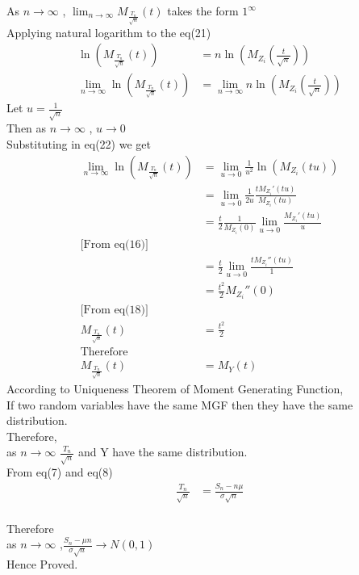 \documentclass[journal,12pt,twocolumn]{IEEEtran}
\begin{document}
As $n \to \infty $ , $\lim_{n \to \infty} M_{\frac{T_n}{\sqrt{n}}}(t)$ takes the form $1^\infty$
\\Applying natural logarithm to the eq(21)
 \begin{align}
    \ln(M_{\frac{T_n}{\sqrt{n}}}(t))&=n\ln(M_{Z_i}(\frac{t}{\sqrt{n}}))\nonumber\\
    \lim_{n \to \infty}\ln(M_{\frac{T_n}{\sqrt{n}}}(t))&=\lim_{n \to \infty}n\ln(M_{Z_i}(\frac{t}{\sqrt{n}}))
    \end{align}
Let $u=\frac{1}{\sqrt{n}}$
\\Then as $n \to \infty $ , $u \to 0 $ 
\\Substituting in eq(22) we get
\begin{align}
    \lim_{n \to \infty}\ln(M_{\frac{T_n}{\sqrt{n}}}(t))&=\lim_{u \to 0}\frac{1}{u^2}\ln(M_{Z_i}(tu))\nonumber\\
    &=\lim_{u \to 0}\frac{1}{2u}\frac{tM_{Z_i}'(tu)}{M_{Z_i}(tu)}\nonumber\\
    &=\frac{t}{2}\frac{1}{M_{Z_i}(0)}\lim_{u \to 0}\frac{M_{Z_i}'(tu)}{u}\nonumber\\
    \text{[From eq(16)]}\nonumber\\
    &=\frac{t}{2}\lim_{u \to 0}\frac{tM_{Z_i}''(tu)}{1} \nonumber\\
    &=\frac{t^2}{2}M_{Z_i}''(0)\nonumber\\
    \text{[From eq(18)]}\nonumber\\
    M_{\frac{T_n}{\sqrt{n}}}(t)&=\frac{t^2}{2} \\
    \text{Therefore}\nonumber\\
    M_{\frac{T_n}{\sqrt{n}}}(t)&=M_Y(t)
    \end{align}
According to Uniqueness Theorem of Moment Generating Function,
\\If two random variables have the same MGF then they have the same distribution.
\\Therefore,
\\as $n \to \infty$ $\frac{T_n}{\sqrt{n}}$ and Y have the same distribution.
\\From eq(7) and eq(8)
 \begin{align}
    \frac{T_n}{\sqrt{n}}&= \frac{S_n-n\mu}{\sigma{\sqrt{n}}}
    \end{align}
\\Therefore
\\ as $n \to \infty$ ,$\frac{S_n -\mu{n}}{\sigma{\sqrt{n}}} \to N(0,1)$
\\Hence Proved.
\\
\end{document}
